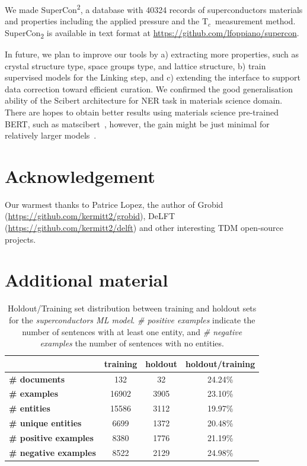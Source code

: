 \documentclass{article}
\newcommand{\tc}{T$_{c}$}
\begin{document}
We made SuperCon\textsuperscript{2}, a database with 40324 records of superconductors materials and properties including the applied pressure and the \tc~measurement method. 
SuperCon\textsubscript{2} is available in text format at \url{https://github.com/lfoppiano/supercon}.

In future, we plan to improve our tools by a) extracting more properties, such as crystal structure type, space groups type, and lattice structure, b) train supervised models for the Linking step, and c) extending the interface to support data correction toward efficient curation.
We confirmed the good generalisation ability of the Scibert architecture for NER task in materials science domain. 
There are hopes to obtain better results using materials science pre-trained BERT, such as matscibert~\cite{gupta_matscibert_2022}, however, the gain might be just minimal for relatively larger models~\cite{hong2022ScholarBERT}.

\section{Acknowledgement}
\label{sec:acknowledgement}
Our warmest thanks to Patrice Lopez, the author of Grobid (\url{https://github.com/kermitt2/grobid}), DeLFT (\url{https://github.com/kermitt2/delft}) and other interesting TDM open-source projects.




\appendix

\section{Additional material}

\begin{table}[ht]
\centering\small
\begin{tabular}{lccc}
\toprule
& \textbf{training}  & \textbf{holdout} & \textbf{holdout/training}      \\
\midrule
\textbf{\# documents}        & 132   & 32    & 24.24\%   \\
\textbf{\# examples}       & 16902 & 3905  & 23.10\%   \\
\textbf{\# entities}        & 15586 & 3112  & 19.97\%   \\
\textbf{\# unique entities} & 6699  & 1372  & 20.48\%   \\
\textbf{\# positive examples}    & 8380  & 1776  & 21.19\%   \\
\textbf{\# negative examples}    & 8522  & 2129  & 24.98\%   \\
\bottomrule

\end{tabular}

\caption{Holdout/Training set distribution between training and holdout sets for the \textit{superconductors ML model}. \textit{\# positive examples} indicate the number of sentences with at least one entity, and \textit{\# negative examples} the number of sentences with no entities.}
\label{tab:training-holdout-set-distribution-annex}
\end{table}
\end{document}
